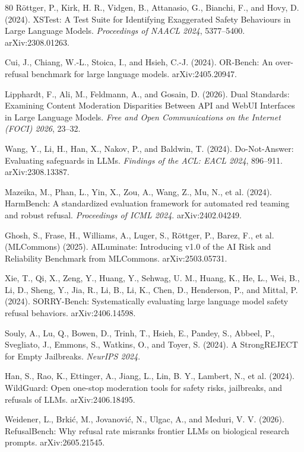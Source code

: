 \documentclass[11pt,a4paper]{article}
\begin{document}
\begin{thebibliography}{80}
R\"ottger, P., Kirk, H. R., Vidgen, B., Attanasio, G., Bianchi, F., and Hovy, D. (2024). XSTest: A Test Suite for Identifying Exaggerated Safety Behaviours in Large Language Models. \textit{Proceedings of NAACL 2024}, 5377--5400. arXiv:2308.01263.

Cui, J., Chiang, W.-L., Stoica, I., and Hsieh, C.-J. (2024). OR-Bench: An over-refusal benchmark for large language models. arXiv:2405.20947.

Lipphardt, F., Ali, M., Feldmann, A., and Gosain, D. (2026). Dual Standards: Examining Content Moderation Disparities Between API and WebUI Interfaces in Large Language Models. \textit{Free and Open Communications on the Internet (FOCI) 2026}, 23--32.

Wang, Y., Li, H., Han, X., Nakov, P., and Baldwin, T. (2024). Do-Not-Answer: Evaluating safeguards in LLMs. \textit{Findings of the ACL: EACL 2024}, 896--911. arXiv:2308.13387.

Mazeika, M., Phan, L., Yin, X., Zou, A., Wang, Z., Mu, N., et al. (2024). HarmBench: A standardized evaluation framework for automated red teaming and robust refusal. \textit{Proceedings of ICML 2024}. arXiv:2402.04249.

Ghosh, S., Frase, H., Williams, A., Luger, S., R\"ottger, P., Barez, F., et al. (MLCommons) (2025). AILuminate: Introducing v1.0 of the AI Risk and Reliability Benchmark from MLCommons. arXiv:2503.05731.

Xie, T., Qi, X., Zeng, Y., Huang, Y., Sehwag, U. M., Huang, K., He, L., Wei, B., Li, D., Sheng, Y., Jia, R., Li, B., Li, K., Chen, D., Henderson, P., and Mittal, P. (2024). SORRY-Bench: Systematically evaluating large language model safety refusal behaviors. arXiv:2406.14598.

Souly, A., Lu, Q., Bowen, D., Trinh, T., Hsieh, E., Pandey, S., Abbeel, P., Svegliato, J., Emmons, S., Watkins, O., and Toyer, S. (2024). A StrongREJECT for Empty Jailbreaks. \textit{NeurIPS 2024}.

Han, S., Rao, K., Ettinger, A., Jiang, L., Lin, B. Y., Lambert, N., et al. (2024). WildGuard: Open one-stop moderation tools for safety risks, jailbreaks, and refusals of LLMs. arXiv:2406.18495.

Weidener, L., Brki\'c, M., Jovanovi\'c, N., Ulgac, A., and Meduri, V. V. (2026). RefusalBench: Why refusal rate misranks frontier LLMs on biological research prompts. arXiv:2605.21545.


\end{thebibliography}
\end{document}
